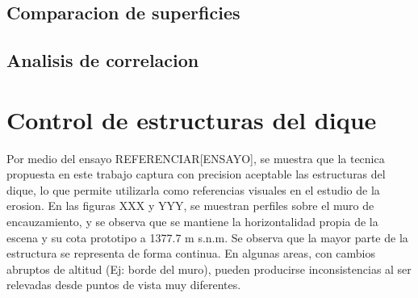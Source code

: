 \subsection{Comparacion de superficies}

\subsection{Analisis de correlacion}

\section{Control de estructuras del dique}

Por medio del ensayo REFERENCIAR[ENSAYO], se muestra que la tecnica propuesta en este trabajo captura con precision aceptable las estructuras del dique, lo que permite utilizarla como referencias visuales en el estudio de la erosion. En las figuras XXX y YYY, se muestran perfiles sobre el muro de encauzamiento, y se observa que se mantiene la horizontalidad propia de la escena y su cota prototipo a 1377.7 m s.n.m. Se observa que la mayor parte de la estructura se representa de forma continua. En algunas areas, con cambios abruptos de altitud (Ej: borde del muro), pueden producirse inconsistencias al ser relevadas desde puntos de vista muy diferentes.

